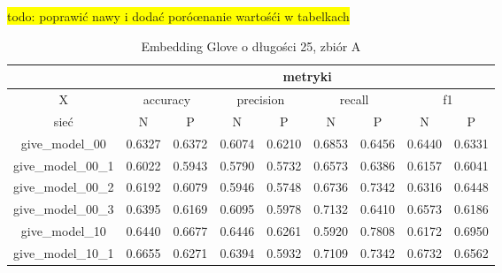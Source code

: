 \colorbox{yellow}{todo: poprawić nawy i dodać poróœnanie wartośći w tabelkach}\\

\begin{table}[!h] \label{tab:wyniki_glove_A} \centering
    \caption{Embedding Glove o długości 25, zbiór A}

    \begin{tabular} {|c|c|c|c|c|c|c|c|c| }    \hline
                                          & \multicolumn{8}{c|}{metryki}                                                                                                                               \\ \hline
        X                                 & \multicolumn{2}{c|}{accuracy} & \multicolumn{2}{c|}{precision} & \multicolumn{2}{c|}{recall} & \multicolumn{2}{c|}{f1}                                     \\ \hline
        sieć                              & N                             & P                              & N                           & P                       & N      & P      & N      & P      \\ \hline
        give\_model\_00                   & 0.6327                        & 0.6372                         & 0.6074                      & 0.6210                  & 0.6853 & 0.6456 & 0.6440 & 0.6331 \\ \hline
        give\_model\_00\_1                & 0.6022                        & 0.5943                         & 0.5790                      & 0.5732                  & 0.6573 & 0.6386 & 0.6157 & 0.6041 \\ \hline
        give\_model\_00\_2                & 0.6192                        & 0.6079                         & 0.5946                      & 0.5748                  & 0.6736 & 0.7342 & 0.6316 & 0.6448 \\ \hline
        give\_model\_00\_3                & 0.6395                        & 0.6169                         & 0.6095                      & 0.5978                  & 0.7132 & 0.6410 & 0.6573 & 0.6186 \\ \hline
        give\_model\_10                   & 0.6440                        & 0.6677                         & 0.6446                      & 0.6261                  & 0.5920 & 0.7808 & 0.6172 & 0.6950 \\ \hline
        give\_model\_10\_1                & 0.6655                        & 0.6271                         & 0.6394                      & 0.5932                  & 0.7109 & 0.7342 & 0.6732 & 0.6562 \\ \hline

\end{tabular}
\end{table}
